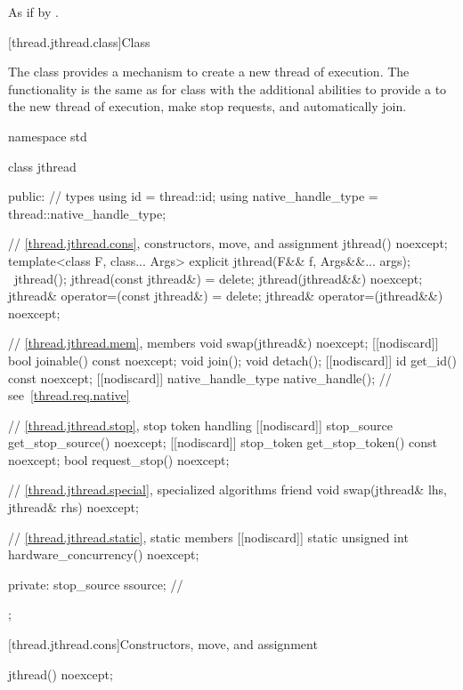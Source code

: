\begin{itemdescr}
\pnum
\effects
As if by .
\end{itemdescr}

[thread.jthread.class]{Class }

\pnum
The class  provides a mechanism
to create a new thread of execution.
The functionality is the same as for
class 
with the additional abilities to provide
a  to the new thread of execution,
make stop requests, and automatically join.

%
\begin{codeblock}
namespace std {
  class jthread {
  public:
    // types
    using id = thread::id;
    using native_handle_type = thread::native_handle_type;

    // \ref{thread.jthread.cons}, constructors, move, and assignment
    jthread() noexcept;
    template<class F, class... Args> explicit jthread(F&& f, Args&&... args);
    ~jthread();
    jthread(const jthread&) = delete;
    jthread(jthread&&) noexcept;
    jthread& operator=(const jthread&) = delete;
    jthread& operator=(jthread&&) noexcept;

    // \ref{thread.jthread.mem}, members
    void swap(jthread&) noexcept;
    [[nodiscard]] bool joinable() const noexcept;
    void join();
    void detach();
    [[nodiscard]] id get_id() const noexcept;
    [[nodiscard]] native_handle_type native_handle();   // see~\ref{thread.req.native}

    // \ref{thread.jthread.stop}, stop token handling
    [[nodiscard]] stop_source get_stop_source() noexcept;
    [[nodiscard]] stop_token get_stop_token() const noexcept;
    bool request_stop() noexcept;

    // \ref{thread.jthread.special}, specialized algorithms
    friend void swap(jthread& lhs, jthread& rhs) noexcept;

    // \ref{thread.jthread.static}, static members
    [[nodiscard]] static unsigned int hardware_concurrency() noexcept;

  private:
    stop_source ssource;        // \expos
  };
}
\end{codeblock}

[thread.jthread.cons]{Constructors, move, and assignment}

%
\begin{itemdecl}
jthread() noexcept;
\end{itemdecl}

